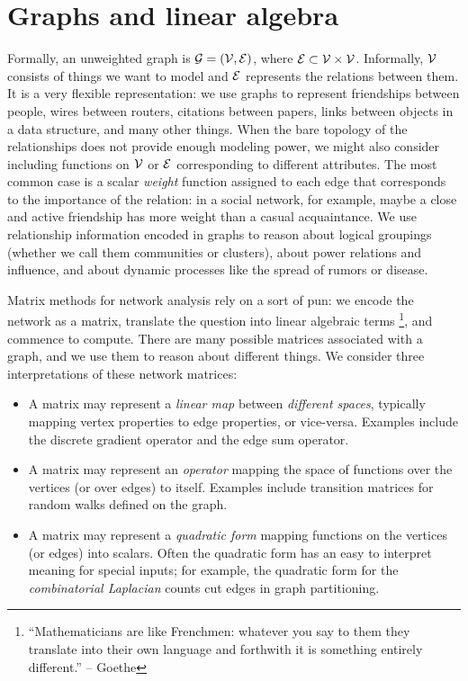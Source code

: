 \documentclass[12pt, leqno]{article} %
\begin{document}

\section{Graphs and linear algebra}

Formally, an unweighted graph is $\mathcal{G} = (\mathcal{V}, \mathcal{E})$, where
$\mathcal{E} \subset \mathcal{V} \times \mathcal{V}$.  Informally, $\mathcal{V}$ consists of
things we want to model and $\mathcal{E}$ represents the relations between
them.  It is a very flexible representation: we use graphs to
represent friendships between people, wires between routers, citations
between papers, links between objects in a data structure, and many
other things.  When the bare topology of the relationships does not
provide enough modeling power, we might also consider including
functions on $\mathcal{V}$ or $\mathcal{E}$ corresponding to different
attributes.  The most common case is a scalar {\em weight} function
assigned to each edge that corresponds to the importance of the
relation: in a social network, for example, maybe a close and active
friendship has more weight than a casual acquaintance.
We use relationship information encoded in graphs to reason about
logical groupings (whether we call them communities or clusters),
about power relations and influence, and about dynamic processes like
the spread of rumors or disease.

Matrix methods for network analysis rely on a sort of pun: we
encode the network as a matrix, translate the question into linear
algebraic terms%
\footnote{``Mathematicians are like Frenchmen: whatever you say to
  them they translate into their own language and forthwith it is
  something entirely different.'' -- Goethe},
and commence to compute.  There are many possible matrices
associated with a graph, and we use them to reason about different
things.  We consider three interpretations of these network matrices:
\begin{itemize}
\item
  A matrix may represent a {\em linear map} between {\em different spaces},
  typically mapping vertex properties to edge properties, or
  vice-versa.  Examples include the discrete gradient operator and the
  edge sum operator.
\item
  A matrix may represent an {\em operator} mapping the space of
  functions over the vertices (or over edges) to itself.  Examples
  include transition matrices for random walks defined on the graph.
\item 
  A matrix may represent a {\em quadratic form} mapping functions
  on the vertices (or edges) into scalars.  Often the quadratic form
  has an easy to interpret meaning for special inputs; for example,
  the quadratic form for the {\em combinatorial Laplacian}
  counts cut edges in graph partitioning.
\end{itemize}
\end{document}
